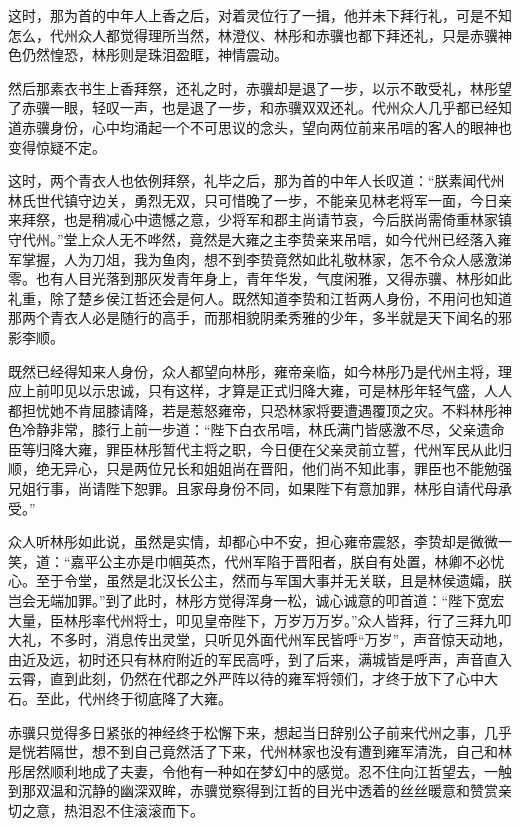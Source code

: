 这时，那为首的中年人上香之后，对着灵位行了一揖，他并未下拜行礼，可是不知怎么，代州众人都觉得理所当然，林澄仪、林彤和赤骥也都下拜还礼，只是赤骥神色仍然惶恐，林彤则是珠泪盈眶，神情震动。

然后那素衣书生上香拜祭，还礼之时，赤骥却是退了一步，以示不敢受礼，林彤望了赤骥一眼，轻叹一声，也是退了一步，和赤骥双双还礼。代州众人几乎都已经知道赤骥身份，心中均涌起一个不可思议的念头，望向两位前来吊唁的客人的眼神也变得惊疑不定。

这时，两个青衣人也依例拜祭，礼毕之后，那为首的中年人长叹道：“朕素闻代州林氏世代镇守边关，勇烈无双，只可惜晚了一步，不能亲见林老将军一面，今日亲来拜祭，也是稍减心中遗憾之意，少将军和郡主尚请节哀，今后朕尚需倚重林家镇守代州。”堂上众人无不哗然，竟然是大雍之主李贽亲来吊唁，如今代州已经落入雍军掌握，人为刀俎，我为鱼肉，想不到李贽竟然如此礼敬林家，怎不令众人感激涕零。也有人目光落到那灰发青年身上，青年华发，气度闲雅，又得赤骥、林彤如此礼重，除了楚乡侯江哲还会是何人。既然知道李贽和江哲两人身份，不用问也知道那两个青衣人必是随行的高手，而那相貌阴柔秀雅的少年，多半就是天下闻名的邪影李顺。

既然已经得知来人身份，众人都望向林彤，雍帝亲临，如今林彤乃是代州主将，理应上前叩见以示忠诚，只有这样，才算是正式归降大雍，可是林彤年轻气盛，人人都担忧她不肯屈膝请降，若是惹怒雍帝，只恐林家将要遭遇覆顶之灾。不料林彤神色冷静非常，膝行上前一步道：“陛下白衣吊唁，林氏满门皆感激不尽，父亲遗命臣等归降大雍，罪臣林彤暂代主将之职，今日便在父亲灵前立誓，代州军民从此归顺，绝无异心，只是两位兄长和姐姐尚在晋阳，他们尚不知此事，罪臣也不能勉强兄姐行事，尚请陛下恕罪。且家母身份不同，如果陛下有意加罪，林彤自请代母承受。”

众人听林彤如此说，虽然是实情，却都心中不安，担心雍帝震怒，李贽却是微微一笑，道：“嘉平公主亦是巾帼英杰，代州军陷于晋阳者，朕自有处置，林卿不必忧心。至于令堂，虽然是北汉长公主，然而与军国大事并无关联，且是林侯遗孀，朕岂会无端加罪。”到了此时，林彤方觉得浑身一松，诚心诚意的叩首道：“陛下宽宏大量，臣林彤率代州将士，叩见皇帝陛下，万岁万万岁。”众人皆拜，行了三拜九叩大礼，不多时，消息传出灵堂，只听见外面代州军民皆呼“万岁”，声音惊天动地，由近及远，初时还只有林府附近的军民高呼，到了后来，满城皆是呼声，声音直入云霄，直到此刻，仍然在代郡之外严阵以待的雍军将领们，才终于放下了心中大石。至此，代州终于彻底降了大雍。

赤骥只觉得多日紧张的神经终于松懈下来，想起当日辞别公子前来代州之事，几乎是恍若隔世，想不到自己竟然活了下来，代州林家也没有遭到雍军清洗，自己和林彤居然顺利地成了夫妻，令他有一种如在梦幻中的感觉。忍不住向江哲望去，一触到那双温和沉静的幽深双眸，赤骥觉察得到江哲的目光中透着的丝丝暖意和赞赏亲切之意，热泪忍不住滚滚而下。

